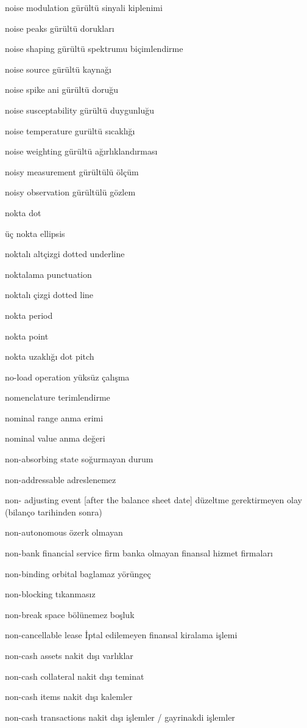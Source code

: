 \documentclass[12pt,fleqn]{article}\usepackage{../../common}
\begin{document}
noise modulation gürültü sinyali kiplenimi

noise peaks gürültü dorukları

noise shaping gürültü spektrumu biçimlendirme

noise source gürültü kaynağı

noise spike ani gürültü doruğu

noise susceptability gürültü duygunluğu

noise temperature gurültü sıcaklığı

noise weighting gürültü ağırlıklandırması

noisy measurement gürültülü ölçüm

noisy observation gürültülü gözlem

nokta dot

üç nokta ellipsis

noktalı altçizgi dotted underline

noktalama punctuation

noktalı çizgi dotted line

nokta period

nokta point

nokta uzaklığı dot pitch

no-load operation yüksüz çalışma

nomenclature terimlendirme

nominal range anma erimi

nominal value anma değeri

non-absorbing state soğurmayan durum

non-addressable adreslenemez

non- adjusting event [after the balance sheet date] düzeltme gerektirmeyen olay (bilanço tarihinden sonra)

non-autonomous özerk olmayan

non-bank financial service firm banka olmayan finansal hizmet firmaları

non-binding orbital baglamaz yörüngeç

non-blocking tıkanmasız

non-break space bölünemez boşluk

non-cancellable lease İptal edilemeyen finansal kiralama işlemi

non-cash assets nakit dışı varlıklar

non-cash collateral nakit dışı teminat

non-cash items nakit dışı kalemler

non-cash transactions nakit dışı işlemler / gayrinakdi işlemler
\end{document}
